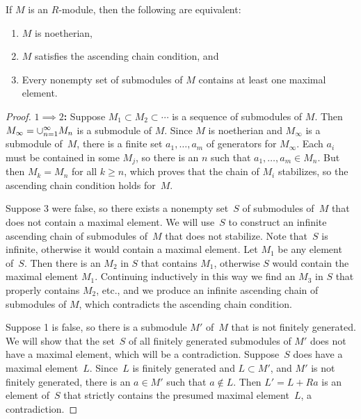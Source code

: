 \begin{proposition}
If $M$ is an $R$-module, then the following are equivalent:
\begin{enumerate}
\item $M$ is noetherian,
\item $M$ satisfies the ascending chain condition, and
\item Every nonempty set of submodules of $M$ contains at least one
maximal element.  
\end{enumerate}
\end{proposition}
\begin{proof}
{\bf $1\implies 2$:} Suppose $M_1\subset M_2\subset \cdots$ is a
sequence of submodules of $M$.  Then $M_\infty=\cup_{n=1}^{\infty}
M_n$ is a submodule of $M$.  Since $M$ is noetherian and $M_\infty$
is a submodule of~$M$, there is a
finite set $a_1,\ldots, a_m$ of generators for $M_{\infty}$.  Each $a_i$
must be contained in some $M_j$, so there is an $n$ such that
$a_1,\ldots, a_m\in M_n$.  But then $M_{k}=M_n$ for all $k\geq n$,
which proves that the chain of $M_i$ stabilizes, 
so the ascending chain condition holds for~$M$.

 Suppose 3 were false, so there exists
a nonempty set~$S$ of submodules of~$M$ that does not contain a
maximal element.  We will use~$S$ to construct an infinite ascending
chain of submodules of~$M$ that does not stabilize.  Note that~$S$ is
infinite, otherwise it would contain a maximal element.  Let $M_1$ be
any element of~$S$.  Then there is an $M_2$ in $S$ that contains
$M_1$, otherwise $S$ would contain the maximal element $M_1$.
Continuing inductively in this way we find an $M_3$ in $S$ that
properly contains $M_2$, etc., and we produce an infinite ascending
chain of submodules of $M$, which contradicts the ascending chain
condition.

 Suppose 1 is false, so there is a
submodule $M'$ of~$M$ that is not finitely generated.  We will show
that the set~$S$ of all finitely generated submodules of $M'$ does not
have a maximal element, which will be a contradiction.  Suppose~$S$
does have a maximal element~$L$.  Since~$L$ is finitely generated and
$L\subset M'$, and $M'$ is not finitely generated, there is an $a\in
M'$ such that $a\not\in L$.  Then $L'=L+Ra$ is an element of~$S$ that
strictly contains the presumed maximal element~$L$, a contradiction.
\end{proof}

